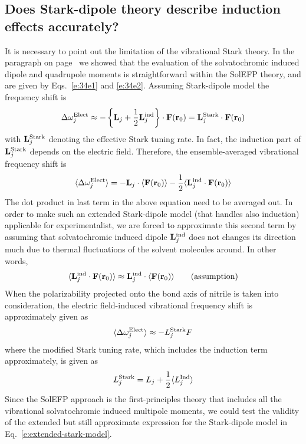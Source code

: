 \documentclass[a4paper,titlepage,twoside,fleqn,12pt]{book}
\begin{document}
\begin{refsection}
\subsection{Does Stark-dipole theory describe induction effects accurately?}

It is necessary to point out the limitation of the
vibrational Stark theory. 
In the paragraph on page~\pageref{p:solindmult} we showed that the
evaluation of the solvatochromic induced dipole and quadrupole moments is
straightforward within the SolEFP theory, and are given by Eqs.~\eqref{e:34e1} and \eqref{e:34e2}.
Assuming Stark\hyp{}dipole model the frequency shift
is
%
\begin{equation} \label{e:dmtp-solmmm-dipole}
 \Delta\omega_j^{\rm Elect} \approx  -
                       \left\{ {\bf L}_j + \frac{1}{2} {\bf L}_j^{\rm ind} \right\} 
                       \cdot {\bf F}({\bf r}_0) = {\bf L}_j^{\rm Stark} \cdot {\bf F}({\bf r}_0)
\end{equation}
%
with ${\bf L}_j^{\rm Stark}$ denoting the effective Stark tuning rate.
In fact, the induction part of ${\bf L}_j^{\rm Stark}$ depends on the electric field.
Therefore, the ensemble\hyp{}averaged vibrational frequency shift
is
%
\begin{equation} 
 \langle \Delta\omega_j^{\rm Elect} \rangle =  -
                        {\bf L}_j  \cdot  \langle  {\bf F}({\bf r}_0) \rangle 
                     - \frac{1}{2} \langle {\bf L}_j^{\rm ind}  \cdot {\bf F}({\bf r}_0) \rangle
\end{equation}
%
The dot product in last term in the above equation need to be averaged out.
In order to make such an extended Stark-dipole model (that handles also induction)
applicable for experimentalist, we are forced to approximate this second term
by assuming that solvatochromic induced dipole ${\bf L}_j^{\rm ind}$ does not
changes its direction much due to thermal fluctuations of the solvent molecules around.
In other words,
%
\begin{equation} \label{e:dmtp-solmmm-dipole-assumption} 
\langle {\bf L}_j^{\rm ind}  \cdot {\bf F}({\bf r}_0) \rangle \approx 
{\bf L}_j^{\rm ind} \cdot  \langle  {\bf F}({\bf r}_0) \rangle 
\qquad \text{(assumption)}
\end{equation}
%
When the polarizability projected onto
the bond axis of nitrile is taken into consideration,
the electric field\hyp{}induced vibrational frequency
shift is approximately given as
%
\begin{equation}  \label{e:extended-stark-model}
\langle \Delta\omega_j^{\rm Elect} \rangle \approx - L_j^{\rm Stark} F
\end{equation}
%
where the modified Stark tuning rate, which includes the
induction term approximately, is given as
%
\begin{equation}  
L_j^{\rm Stark}  = L_j + \frac{1}{2} \langle L_j^{\rm Ind} \rangle
\end{equation}
%
Since
the SolEFP approach is the first\hyp{}principles theory that includes
all the vibrational solvatochromic induced multipole moments,
we could test the validity of the extended but still approximate
expression for the Stark\hyp{}dipole model in Eq.~\eqref{e:extended-stark-model}. 


\end{refsection}
\end{document}
